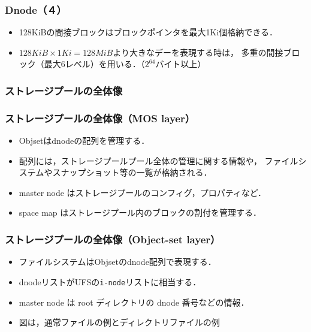 \documentclass{beamer}                   %
\begin{document}
\begin{frame}[fragile]
  \frametitle{Dnode（４）}
  \begin{itemize}
  \item 128KiBの間接ブロックはブロックポインタを最大1Ki個格納できる．
  \item $128KiB \times 1Ki = 128MiB$より大きなデーを表現する時は，
    多重の間接ブロック（最大6レベル）を用いる．（$2^{64}$バイト以上）
  \end{itemize}
  \vfill
\end{frame}

\begin{frame}[fragile]
  \frametitle{ストレージプールの全体像}
  \vfill
\end{frame}

\begin{frame}[fragile]
  \frametitle{ストレージプールの全体像（MOS layer）}
  \begin{itemize}
  \item Objsetはdnodeの配列を管理する．
  \item 配列には，ストレージプールプール全体の管理に関する情報や，
    ファイルシステムやスナップショット等の一覧が格納される．
  \item master node はストレージプールのコンフィグ，プロパティなど．
  \item space map はストレージプール内のブロックの割付を管理する．
  \end{itemize}
  \vfill
\end{frame}

\begin{frame}[fragile]
  \frametitle{ストレージプールの全体像（Object-set layer）}
  \begin{itemize}
  \item ファイルシステムはObjsetのdnode配列で表現する．
  \item dnodeリストがUFSの\texttt{i-node}リストに相当する．
  \item master node は root ディレクトリの dnode 番号などの情報．
  \item 図は，通常ファイルの例とディレクトリファイルの例
  \end{itemize}
  \vfill
\end{frame}
\end{document}
